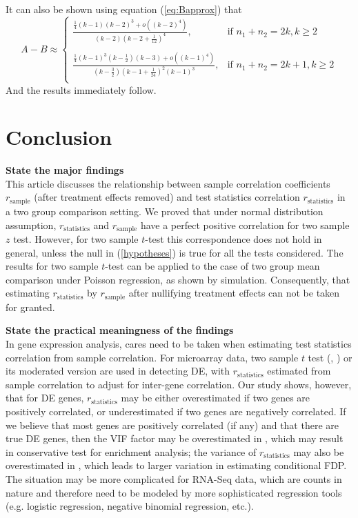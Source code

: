 \documentclass[12pt, a4paper]{article}
\begin{document}
	It can also be shown using equation (\ref{eq:Bapprox}) that
	\begin{equation}\label{eq:AminusB}
		A- B \approx  
		\begin{cases}
		\frac{\frac{1}{4}(k-1)(k-2)^3 + o((k-2)^4)}{(k-2)(k-2 + \frac{1}{12})^4},& \text{if } n_1 + n_2 = 2k, k\geq 2 \\
		~\\
		\frac{\frac{1}{4}(k-1)^3(k-\frac{1}{2})(k-3) + o((k-1)^4)}{(k-\frac{3}{2})(k-1+ \frac{1}{24})^2(k-1)^3},& \text{if } n_1 + n_2 = 2k+1, k\geq 2 \\
		\end{cases}
	\end{equation}
	And the results immediately follow.
	
 
	
	
	
	\section{Conclusion}
	
	\textbf{State the major findings} \\
	This article discusses the relationship between sample correlation coefficients $r_{\text{sample}}$ 
	(after treatment effects removed) and test statistics correlation $r_\text{statistics}$ in a two
	group comparison setting. We proved that under normal distribution assumption, $r_\text{statistics}$
	and $r_\text{sample}$ have a perfect positive correlation for two sample $z$ test. However, for two
	sample $t$-test this correspondence does not hold in general, unless the null in (\ref{hypotheses})
	is true for all the tests considered. The results for two sample $t$-test can be applied to the case
	of two group mean comparison under Poisson regression, as shown by simulation. Consequently, that
	estimating  $r_\text{statistics}$ by $r_{\text{sample}}$ after nullifying treatment effects can not
	be taken for granted.
	
	\textbf{State the practical meaningness of the findings}\\
	In gene expression analysis, cares need to be taken when estimating test statistics correlation from
	sample correlation. For microarray data, two sample $t$ test (\cite{efron2007correlation},
	\cite{barry2008statistical}) or its moderated version \citep{wu2012camera} are used in detecting DE,
	with $r_\text{statistics}$  estimated from sample correlation to adjust for inter-gene correlation.
	Our study shows, however, that for DE genes, $r_\text{statistics}$ may be either overestimated if
	two genes are positively correlated, or underestimated if two genes are negatively correlated. If we
	believe that most genes are positively correlated (if any) and that there are true DE genes, then
	the VIF factor may be overestimated in \cite{wu2012camera}, which may result in conservative test
	for enrichment analysis; the variance of  $r_\text{statistics}$ may also be overestimated in
	\cite{efron2007correlation}, which leads to larger variation in estimating conditional FDP. The
	situation may be more complicated for RNA-Seq data, which are counts in nature and therefore need to
	be modeled by more sophisticated regression tools (e.g. logistic regression, negative binomial
	regression, etc.). 
	
\end{document}
